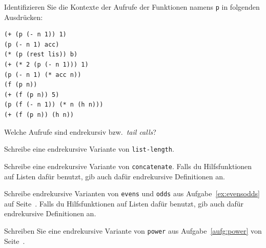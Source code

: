 \begin{aufgabe}
  Identifizieren Sie die Kontexte der Aufrufe der Funktionen namens
  \texttt{p} in folgenden Ausdrücken:
  
\begin{verbatim}
(+ (p (- n 1)) 1)
(p (- n 1) acc)
(* (p (rest lis)) b)
(+ (* 2 (p (- n 1))) 1)
(p (- n 1) (* acc n))
(f (p n))
(+ (f (p n)) 5)
(p (f (- n 1)) (* n (h n))) 
(+ (f (p n)) (h n))
\end{verbatim}
  Welche Aufrufe sind endrekursiv bzw.\ \textit{tail calls}?
\end{aufgabe}

\begin{aufgabe}
  Schreibe eine endrekursive Variante von \texttt{list-length}.
\end{aufgabe}

\begin{aufgabe}
  Schreibe eine endrekursive Variante von
  \texttt{concatenate}.  Falls du Hilfsfunktionen auf
  Listen dafür benutzt, gib auch dafür endrekursive Definitionen an.
\end{aufgabe}

\begin{aufgabe}
  Schreibe endrekursive Varianten von \texttt{evens} und \texttt{odds}
  aus Aufgabe~\ref{ex:evensodds} auf Seite~\pageref{ex:evensodds}.
  Falls du Hilfsfunktionen auf Listen dafür benutzt, gib auch dafür
  endrekursive Definitionen an.
\end{aufgabe}

\begin{aufgabe}
  Schreiben Sie eine endrekursive Variante von \texttt{power} aus
  Aufgabe~\ref{aufg:power} von Seite~\pageref{aufg:power}.
\end{aufgabe}


